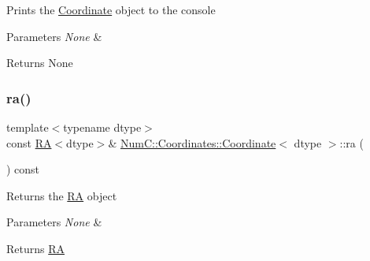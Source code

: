 Prints the \mbox{\hyperlink{class_num_c_1_1_coordinates_1_1_coordinate}{Coordinate}} object to the console


\begin{DoxyParams}{Parameters}
{\em None} & \\
\hline
\end{DoxyParams}
\begin{DoxyReturn}{Returns}
None 
\end{DoxyReturn}
\mbox{\label{class_num_c_1_1_coordinates_1_1_coordinate_a55daf8b43d979586753e89c7cb2a8172}} 
\subsubsection{\texorpdfstring{ra()}{ra()}}
{\footnotesize\ttfamily template$<$typename dtype$>$ \\
const \mbox{\hyperlink{class_num_c_1_1_coordinates_1_1_r_a}{RA}}$<$dtype$>$\& \mbox{\hyperlink{class_num_c_1_1_coordinates_1_1_coordinate}{Num\+C\+::\+Coordinates\+::\+Coordinate}}$<$ dtype $>$\+::ra (\begin{DoxyParamCaption}{ }\end{DoxyParamCaption}) const\hspace{0.3cm}{\ttfamily [inline]}}

Returns the \mbox{\hyperlink{class_num_c_1_1_coordinates_1_1_r_a}{RA}} object


\begin{DoxyParams}{Parameters}
{\em None} & \\
\hline
\end{DoxyParams}
\begin{DoxyReturn}{Returns}
\mbox{\hyperlink{class_num_c_1_1_coordinates_1_1_r_a}{RA}} 
\end{DoxyReturn}
\mbox{\label{class_num_c_1_1_coordinates_1_1_coordinate_a9c1a2db9589b6454b89d509a608d2a8d}} 
